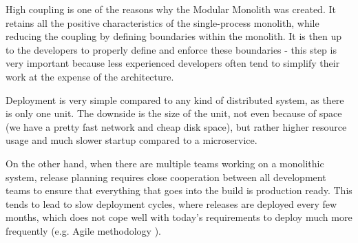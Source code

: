 High coupling is one of the reasons why the Modular Monolith was created. It retains all the positive characteristics of the single-process monolith, while reducing the coupling by defining boundaries within the monolith. It is then up to the developers to properly define and enforce these boundaries - this step is very important because less experienced developers often tend to simplify their work at the expense of the architecture.

Deployment is very simple compared to any kind of distributed system, as there is only one unit. The downside is the size of the unit, not even because of space (we have a pretty fast network and cheap disk space), but rather higher resource usage and much slower startup compared to a microservice.

On the other hand, when there are multiple teams working on a monolithic system, release planning requires close cooperation between all development teams to ensure that everything that goes into the build is production ready. This tends to lead to slow deployment cycles, where releases are deployed every few months, which does not cope well with today's requirements to deploy much more frequently (e.g. Agile methodology \cite{AGILE_MANIFESTO}).


